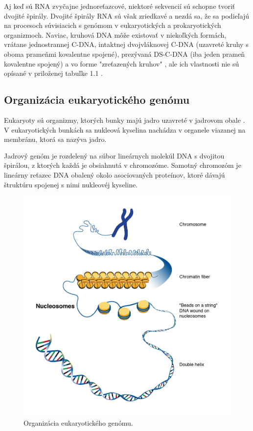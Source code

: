 Aj keď sú RNA zvyčajne jednoreťazcové, niektoré sekvencií sú schopne tvoriť dvojité špirály.
Dvojité špirály RNA sú však zriedkavé a nezdá sa, že sa podieľajú na procesoch súvisiacich s genómom v eukaryotických a prokaryotických organizmoch.
Naviac, kruhová DNA môže existovať v niekoľkých formách, vrátane jednostrannej C-DNA, intaktnej dvojvláknovej C-DNA (uzavreté kruhy s oboma prameňmi kovalentne spojené),
prezývaná DS-C-DNA (iba jeden prameň kovalentne spojený) a vo forme "zreťazených kruhov" \cite{MolecularGenetics}, ale ich vlastnosti nie sú opísané v priloženej tabuľke 1.1 .

\subsection{Organizácia eukaryotického genómu}
Eukaryoty sú organizmy, ktorých bunky majú jadro uzavreté v jadrovom obale \cite{BioDict}.
V eukaryotických bunkách sa nukleová kyselina nachádza v organele viazanej na membránu, ktorá sa nazýva jadro.

Jadrový genóm je rozdelený na súbor lineárnych molekúl DNA s dvojitou špirálou, z ktorých každá je obsiahnutá v chromozóme.
Samotný chromozóm je lineárny reťazec DNA obalený okolo asociovaných proteínov, ktoré dávajú štruktúru spojenej s nimi nukleovéj kyseline.

\begin{figure}[!ht]
	\centering
	\includegraphics[width=.8\textwidth]{figures/nucleosome1}
	\caption{Organizácia eukaryotického genómu.\label{o:latex_friendly_zone}}
\end{figure}

